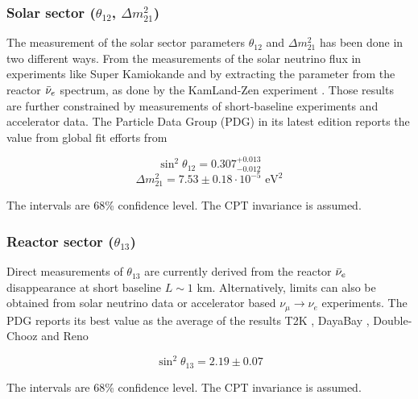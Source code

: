 \documentclass[../main.tex]{subfiles}
\begin{document}
\subsubsection{Solar sector ($\theta_{12}$, $\Delta m^2_{21}$)}

The measurement of the solar sector parameters $\theta_{12}$ and $\Delta m^2_{21}$ has been done in two different ways. From the measurements of the solar neutrino flux in experiments like Super Kamiokande \cite{super-kamiokande_collaboration_solar_2016} and by extracting the parameter from the reactor $\bar{\nu}_{e}$ spectrum, as done by the KamLand-Zen experiment \cite{suzuki_results_2005, kamland_collaboration_reactor_2013}. Those results are further constrained by measurements of short-baseline experiments and accelerator data. The Particle Data Group (PDG) in its latest edition \cite{ParticleDataGroup:2024cfk} reports the value from global fit efforts from \cite{super-kamiokande_collaboration_solar_2016, kamland_collaboration_reactor_2013}

\begin{equation*}
  \sin^2\theta_{12} = 0.307^{+0.013}_{-0.012}
\end{equation*}
\begin{equation*}
  \Delta m^2_{21} = 7.53 \pm 0.18 \cdot 10^{-5} \text{ eV}^2
\end{equation*}

The intervals are 68\% confidence level. The CPT invariance is assumed.

\subsubsection{Reactor sector ($\theta_{13}$)}

Direct measurements of $\theta_{13}$ are currently derived from the reactor $\bar{\nu}_{e}$ disappearance at short baseline $L \sim 1$ km. Alternatively, limits can also be obtained from solar neutrino data or accelerator based $\nu_\mu \rightarrow \nu_e$ experiments. The PDG reports its best value as the average of the results T2K \cite{abe_measurements_2023}, DayaBay \cite{daya_bay_collaboration_precision_2023, daya_bay_collaboration_new_2016}, Double-Chooz \cite{de_kerret_double_2020} and Reno \cite{shin_observation_2020, reno_collaboration_measurement_2018}

\begin{equation*}
  \sin^2\theta_{13} = 2.19 \pm 0.07
\end{equation*}


The intervals are 68\% confidence level. The CPT invariance is assumed.
\end{document}
